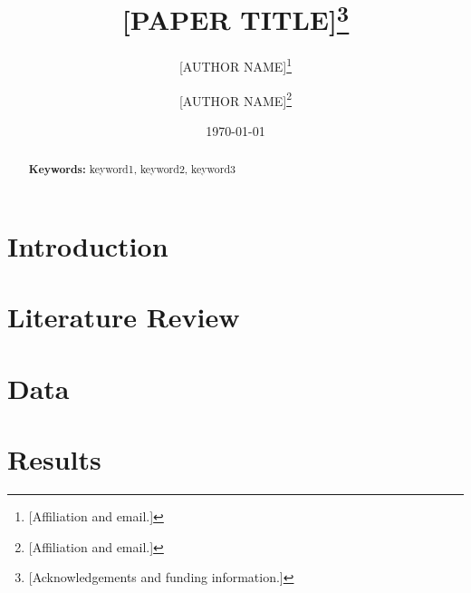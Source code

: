 \documentclass[12pt,a4paper]{article}
\begin{document}
\begin{titlepage}

    \title{[PAPER TITLE]\thanks{[Acknowledgements and funding information.]}}

    \author{[AUTHOR NAME]\thanks{[Affiliation and email.]} \and [AUTHOR NAME]\thanks{[Affiliation and email.]}}

    \date{\today}

    \maketitle

    \begin{abstract}

        \bigskip
\noindent\textbf{Keywords:} keyword1, keyword2, keyword3

    \end{abstract}

\setcounter{page}{0} \thispagestyle{empty}

\end{titlepage}

\clearpage

\doublespacing


\section{Introduction}


\section{Literature Review}


% 

% 

\section{Data}


\section{Results}

\end{document}
